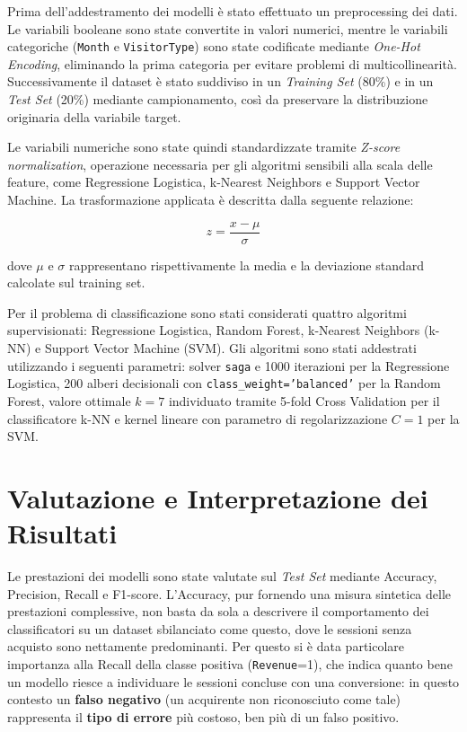 \documentclass[11pt,a4paper]{article}
\begin{document}
Prima dell'addestramento dei modelli è stato effettuato un preprocessing dei dati. Le variabili booleane sono state convertite in valori numerici, mentre le variabili categoriche (\texttt{Month} e \texttt{VisitorType}) sono state codificate mediante \textit{One-Hot Encoding}, eliminando la prima categoria per evitare problemi di multicollinearità. Successivamente il dataset è stato suddiviso in un \textit{Training Set} (80\%) e in un \textit{Test Set} (20\%) mediante campionamento, così da preservare la distribuzione originaria della variabile target.

Le variabili numeriche sono state quindi standardizzate tramite \textit{Z-score normalization}, operazione necessaria per gli algoritmi sensibili alla scala delle feature, come Regressione Logistica, k-Nearest Neighbors e Support Vector Machine. La trasformazione applicata è descritta dalla seguente relazione:

\begin{equation}
z=\frac{x-\mu}{\sigma}
\end{equation}

dove $\mu$ e $\sigma$ rappresentano rispettivamente la media e la deviazione standard calcolate sul training set.

Per il problema di classificazione sono stati considerati quattro algoritmi supervisionati: Regressione Logistica, Random Forest, k-Nearest Neighbors (k-NN) e Support Vector Machine (SVM). Gli algoritmi sono stati addestrati utilizzando i seguenti parametri: solver \texttt{saga} e 1000 iterazioni per la Regressione Logistica, 200 alberi decisionali con \texttt{class\_weight='balanced'} per la Random Forest, valore ottimale $k=7$ individuato tramite 5-fold Cross Validation per il classificatore k-NN e kernel lineare con parametro di regolarizzazione $C=1$ per la SVM.

\section{Valutazione e Interpretazione dei Risultati}
\label{sec: Valutazione}

Le prestazioni dei modelli sono state valutate sul \textit{Test Set} mediante Accuracy, Precision, Recall e F1-score. L'Accuracy, pur fornendo una misura sintetica delle prestazioni complessive, non basta da sola a descrivere il comportamento dei classificatori su un dataset sbilanciato come questo, dove le sessioni senza acquisto sono nettamente predominanti. Per questo si è data particolare importanza alla Recall della classe positiva (\texttt{Revenue}=1), che indica quanto bene un modello riesce a individuare le sessioni concluse con una conversione: in questo contesto un \textbf{falso negativo} (un acquirente non riconosciuto come tale) rappresenta il \textbf{tipo di errore} più costoso, ben più di un falso positivo.
\end{document}
